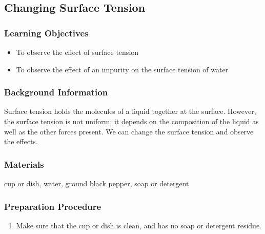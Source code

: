\subsection{Changing Surface Tension}

\subsubsection*{Learning Objectives}
\begin{itemize}
\item{To observe the effect of surface tension}
\item{To observe the effect of an impurity on the surface tension of water}
\end{itemize}

\subsubsection*{Background Information}
Surface tension holds the molecules of a liquid together at the surface.  However, the surface tension is not uniform; it depends on the composition of the liquid as well as the other forces present.  We can change the surface tension and observe the effects.

\subsubsection*{Materials}
cup or dish, water, ground black pepper, soap or detergent

\subsubsection*{Preparation Procedure}
\begin{enumerate}
\item{Make sure that the cup or dish is clean, and has no soap or detergent residue.}
\end{enumerate}

